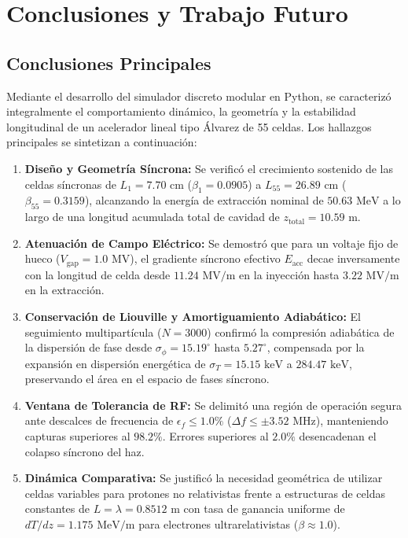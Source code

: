 \chapter{Conclusiones y Trabajo Futuro}

\section{Conclusiones Principales}
Mediante el desarrollo del simulador discreto modular en Python, se caracterizó integralmente el comportamiento dinámico, la geometría y la estabilidad longitudinal de un acelerador lineal tipo Álvarez de 55 celdas. Los hallazgos principales se sintetizan a continuación:

\begin{enumerate}
    \item \textbf{Diseño y Geometría Síncrona:} Se verificó el crecimiento sostenido de las celdas síncronas de $L_1 = 7.70\text{ cm}$ ($\beta_1 = 0.0905$) a $L_{55} = 26.89\text{ cm}$ ($\beta_{55} = 0.3159$), alcanzando la energía de extracción nominal de $50.63\text{ MeV}$ a lo largo de una longitud acumulada total de cavidad de $z_{\text{total}} = 10.59\text{ m}$.
    \item \textbf{Atenuación de Campo Eléctrico:} Se demostró que para un voltaje fijo de hueco ($V_{\text{gap}} = 1.0\text{ MV}$), el gradiente síncrono efectivo $E_{\text{acc}}$ decae inversamente con la longitud de celda desde $11.24\text{ MV/m}$ en la inyección hasta $3.22\text{ MV/m}$ en la extracción.
    \item \textbf{Conservación de Liouville y Amortiguamiento Adiabático:} El seguimiento multipartícula ($N = 3000$) confirmó la compresión adiabática de la dispersión de fase desde $\sigma_\phi = 15.19^\circ$ hasta $5.27^\circ$, compensada por la expansión en dispersión energética de $\sigma_T = 15.15\text{ keV}$ a $284.47\text{ keV}$, preservando el área en el espacio de fases síncrono.
    \item \textbf{Ventana de Tolerancia de RF:} Se delimitó una región de operación segura ante descalces de frecuencia de $\epsilon_f \le 1.0\%$ ($\Delta f \le \pm 3.52\text{ MHz}$), manteniendo capturas superiores al $98.2\%$. Errores superiores al $2.0\%$ desencadenan el colapso síncrono del haz.
    \item \textbf{Dinámica Comparativa:} Se justificó la necesidad geométrica de utilizar celdas variables para protones no relativistas frente a estructuras de celdas constantes de $L = \lambda = 0.8512\text{ m}$ con tasa de ganancia uniforme de $dT/dz = 1.175\text{ MeV/m}$ para electrones ultrarelativistas ($\beta \approx 1.0$).
\end{enumerate}

